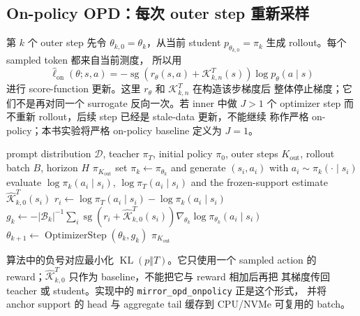 \subsection{On-policy OPD：每次 outer step 重新采样}
\label{subsec:ch2-opd-onpolicy-baseline}

第 $k$ 个 outer step 先令 $\theta_{k,0}=\theta_k$，从当前 student
$p_{\theta_{k,0}}=\pi_k$ 生成 rollout。每个 sampled token 都来自当前测度，
所以用
\begin{equation}
\widehat\ell_{\mathrm{on}}(\theta;s,a)
 =-\operatorname{sg}\!\left(r_\theta(s,a)+\mathcal K_{k,n}^{T}(s)\right)
 \log p_\theta(a\mid s)
\end{equation}
进行 score-function 更新。这里 $r_\theta$ 和 $\mathcal K_{k,n}^{T}$ 在构造该步梯度后
整体停止梯度；它们不是再对同一个 surrogate 反向一次。若 inner 中做 $J>1$
个 optimizer step 而不重新 rollout，后续 step 已经是 stale-data 更新，不能继续
称作严格 on-policy；本书实验将严格 on-policy baseline 定义为 $J=1$。

\begin{algorithm}[ht]
\caption{On-policy OPD baseline\\{\small\textit{Semantics: 每个 outer step 用当前 student 重新 rollout；无 mirror 正则}}}
\begin{algorithmic}[1]
\Require prompt distribution $\mathcal D$, teacher $\pi_T$, initial policy $\pi_0$, outer steps $K_{\mathrm{out}}$, rollout batch $B$, horizon $H$
\Ensure $\pi_{K_{\mathrm{out}}}$
    \State set $\pi_k\gets\pi_{\theta_k}$ and generate $(s_i,a_i)$ with $a_i\sim\pi_k(\cdot\mid s_i)$
    \State evaluate $\log\pi_k(a_i\mid s_i)$, $\log\pi_T(a_i\mid s_i)$ and the frozen-support estimate $\widehat{\mathcal K}_{k,0}^{T}(s_i)$
    \State $r_i\gets\log\pi_T(a_i\mid s_i)-\log\pi_k(a_i\mid s_i)$
    \State $g_k\gets-|\mathcal B_k|^{-1}\sum_i\operatorname{sg}(r_i+\widehat{\mathcal K}_{k,0}^{T}(s_i))\nabla_{\theta_k}\log\pi_{\theta_k}(a_i\mid s_i)$
    \State $\theta_{k+1}\gets\operatorname{OptimizerStep}(\theta_k,g_k)$
\EndFor
\State \Return $\pi_{K_{\mathrm{out}}}$
\end{algorithmic}
\end{algorithm}

算法中的负号对应最小化 $\operatorname{KL}(p\Vert T)$。它只使用一个 sampled
action 的 reward；$\widehat{\mathcal K}_{k,0}^{T}$ 只作为 baseline，不能把它与 reward 相加后再把
其梯度传回 teacher 或 student。实现中的 \texttt{mirror\_opd\_onpolicy} 正是这个形式，
并将 anchor support 的 head 与 aggregate tail 缓存到 CPU/NVMe 可复用的 batch。

